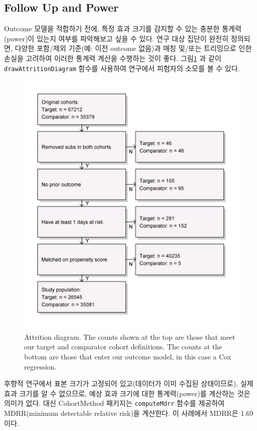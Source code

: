\documentclass[11pt]{book}
\theoremstyle{definition}
\theoremstyle{definition}
\theoremstyle{definition}
\theoremstyle{remark}
\begin{document}
\subsection{Follow Up and Power}\label{follow-up-and-power}

Outcome 모델을 적합하기 전에, 특정 효과 크기를 감지할 수 있는 충분한
통계력(power)이 있는지 여부를 파악해보고 싶을 수 있다. 연구 대상 집단이
완전히 정의되면, 다양한 포함/제외 기준(예: 이전 outcome 없음)과 매칭
및/또는 트리밍으로 인한 손실을 고려하여 이러한 통계력 계산을 수행하는
것이 좋다. 그림\ref{fig:attrition} 과 같이 \texttt{drawAttritionDiagram}
함수를 사용하여 연구에서 피험자의 소모를 볼 수 있다.

\begin{figure}

{\centering \includegraphics[width=0.7\linewidth]{images/PopulationLevelEstimation/attrition} 

}

\caption{Attrition diagram. The counts shown at the top are those that meet our target and comparator cohort definitions. The counts at the bottom are those that enter our outcome model, in  this case a Cox regression.}\label{fig:attrition}
\end{figure}

후향적 연구에서 표본 크기가 고정되어 있고(데이터가 이미 수집된
상태이므로), 실제 효과 크기를 알 수 없으므로, 예상 효과 크기에 대한
통계력(power)를 계산하는 것은 의미가 없다. 대신 CohortMethod 패키지는
\texttt{computeMdrr} 함수를 제공하여 MDRR(minimum detectable relative
risk)을 계산한다. 이 사례에서 MDRR은 1.69이다.
 
\end{document}
